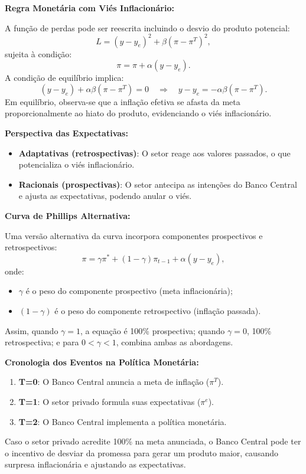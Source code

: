 \documentclass[a4paper,12pt]{article}[abntex2]
\begin{document}
\textbf{Regra Monetária com Viés Inflacionário:}

A função de perdas pode ser reescrita incluindo o desvio do produto potencial:
\[
L = (y - y_e)^2 + \beta (\pi - \pi^T)^2,
\]
sujeita à condição:
\[
\pi = \pi + \alpha (y - y_e).
\]
A condição de equilíbrio implica:
\[
(y - y_e) + \alpha\beta (\pi - \pi^T) = 0 \quad \Rightarrow \quad y - y_e = -\alpha\beta (\pi - \pi^T).
\]
Em equilíbrio, observa-se que a inflação efetiva se afasta da meta proporcionalmente ao hiato do produto, evidenciando o viés inflacionário.

\textbf{Perspectiva das Expectativas:}
\begin{itemize}
    \item \textbf{Adaptativas (retrospectivas)}: O setor reage aos valores passados, o que potencializa o viés inflacionário.
    \item \textbf{Racionais (prospectivas)}: O setor antecipa as intenções do Banco Central e ajusta as expectativas, podendo anular o viés.
\end{itemize}

\textbf{Curva de Phillips Alternativa:}

Uma versão alternativa da curva incorpora componentes prospectivos e retrospectivos:
\[
\pi = \gamma \pi^* + (1-\gamma)\pi_{t-1} + \alpha (y - y_e),
\]
onde:
\begin{itemize}
    \item $\gamma$ é o peso do componente prospectivo (meta inflacionária);
    \item $(1-\gamma)$ é o peso do componente retrospectivo (inflação passada).
\end{itemize}
Assim, quando $\gamma=1$, a equação é 100\% prospectiva; quando $\gamma=0$, 100\% retrospectiva; e para $0<\gamma<1$, combina ambas as abordagens.

\textbf{Cronologia dos Eventos na Política Monetária:}
\begin{enumerate}
    \item \textbf{T=0}: O Banco Central anuncia a meta de inflação ($\pi^T$).
    \item \textbf{T=1}: O setor privado formula suas expectativas ($\pi^e$).
    \item \textbf{T=2}: O Banco Central implementa a política monetária.
\end{enumerate}
Caso o setor privado acredite 100\% na meta anunciada, o Banco Central pode ter o incentivo de desviar da promessa para gerar um produto maior, causando surpresa inflacionária e ajustando as expectativas.
\end{document}
